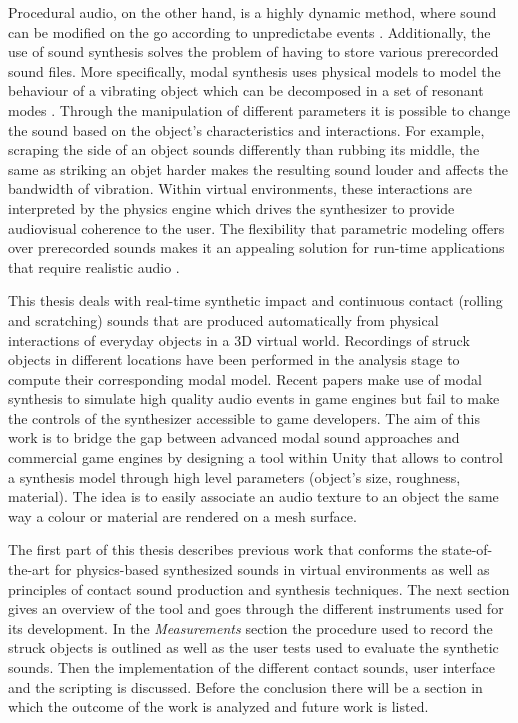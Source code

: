 Procedural audio, on the other hand, is a highly dynamic method, where sound can be modified on the go according to unpredictabe events \cite{farnell2010designing}. Additionally, the use of sound synthesis solves the problem of having to store various prerecorded sound files. More specifically, modal synthesis uses physical models to model the behaviour of a vibrating object which can be decomposed in a set of resonant modes \cite{bilbao2009numerical}. Through the manipulation of different parameters it is possible to change the sound based on the object's characteristics and interactions. For example, scraping the side of an object sounds differently than rubbing its middle, the same as striking an objet harder makes the resulting sound louder and affects the bandwidth of vibration. Within virtual environments, these interactions are interpreted by the physics engine which drives the synthesizer to provide audiovisual coherence to the user.  The flexibility that parametric modeling offers over prerecorded sounds makes it an appealing solution for run-time applications that require realistic audio \cite{Cook:2002:RSS:515316}. 

This thesis deals with real-time synthetic impact and continuous contact (rolling and scratching) sounds that are produced automatically from physical interactions of everyday objects in a 3D virtual world. Recordings of struck objects in different locations have been performed in the analysis stage to compute their corresponding modal model. Recent papers \cite{lloyd2011sound, bonneel2008fast} make use of modal synthesis to simulate high quality audio events in game engines but fail to make the controls of the synthesizer accessible to game developers. The aim of this work is to bridge the gap between advanced modal sound approaches and commercial game engines by designing a tool within Unity\textsuperscript{\textregistered} that allows to control a synthesis model through high level parameters (object's size, roughness, material). The idea is to easily associate an audio texture to an object the same way  a colour or material are rendered on a mesh surface. 

The first part of this thesis describes previous work that conforms the state-of-the-art for physics-based synthesized sounds in virtual environments as well as principles of contact sound production and synthesis techniques. The next section gives an overview of the tool and goes through the different instruments used for its development. In the \textit{Measurements} section the procedure used to record the struck objects is outlined as well as the user tests used to evaluate the synthetic sounds. Then the implementation of the different contact sounds, user interface and the scripting is discussed. Before the conclusion there will be a section in which the outcome of the work is analyzed and future work is listed.

